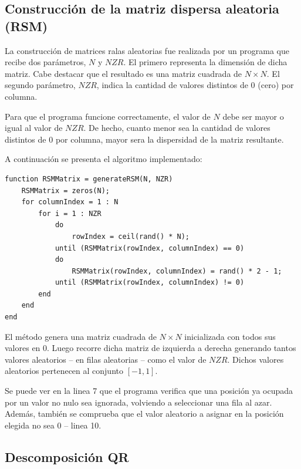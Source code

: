 \documentclass[spanish]{article}
\begin{document}
        \subsection{Construcción de la matriz dispersa aleatoria (RSM)}
        
            \par La construcción de matrices ralas aleatorias fue realizada por un programa que recibe dos parámetros, $N$ y $NZR$. El primero representa la dimensión de dicha matriz. Cabe destacar que el resultado es una matriz cuadrada de $N\times N$. El segundo parámetro, $NZR$, indica la cantidad de valores distintos de $0$ (cero) por columna.
            
            \par Para que el programa funcione correctamente, el valor de $N$ debe ser mayor o igual al valor de $NZR$. De hecho, cuanto menor sea la cantidad de valores distintos de $0$ por columna, mayor sera la dispersidad de la matriz resultante.
            
            \par A continuación se presenta el algoritmo implementado:
            
            \begin{lstlisting}[caption = Construcción de matrices dispersas aleatorias.]
function RSMMatrix = generateRSM(N, NZR)
	RSMMatrix = zeros(N);
	for columnIndex = 1 : N
		for i = 1 : NZR
			do
				rowIndex = ceil(rand() * N);
			until (RSMMatrix(rowIndex, columnIndex) == 0)
			do
				RSMMatrix(rowIndex, columnIndex) = rand() * 2 - 1;
			until (RSMMatrix(rowIndex, columnIndex) != 0)
		end
	end
end
            \end{lstlisting}
            
            \par El método genera una matriz cuadrada de $N\times N$ inicializada con todos sus valores en $0$. Luego recorre dicha matriz de izquierda a derecha generando tantos valores aleatorios – en filas aleatorias – como el valor de $NZR$. Dichos valores aleatorios pertenecen al conjunto $[-1, 1]$.
           
            \par Se puede ver en la linea 7 que el programa verifica que una posición ya ocupada por un valor no nulo sea ignorada, volviendo a seleccionar una fila al azar. Además, también se comprueba que el valor aleatorio a asignar en la posición elegida no sea $0$ – linea 10.


        \subsection{Descomposición QR}
        
\end{document}
